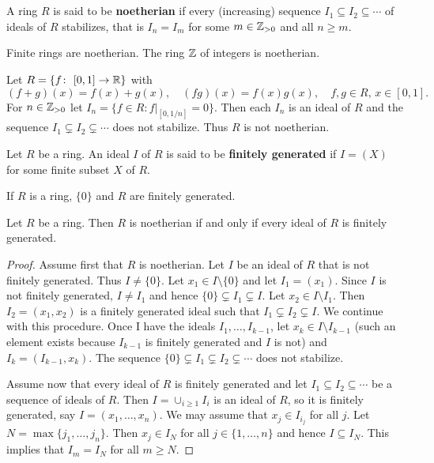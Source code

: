 \chapter{}


\begin{definition}
	A ring $R$ is said to be \textbf{noetherian} if every (increasing)
	sequence $I_1\subseteq I_2\subseteq\cdots$ of ideals of $R$
	stabilizes, that is $I_n=I_m$ for some $m\in\mathbb{Z}_{>0}$ and all $n\geq m$. 
\end{definition}

Finite rings
are noetherian. The ring $\mathbb{Z}$ of integers is noetherian.

\begin{exercise}
Let $R=\{f\colon [0,1]\to\R\}$ with 
\[
(f+g)(x)=f(x)+g(x),
\quad
(fg)(x)=f(x)g(x),
\quad
f,g\in R,\,x\in [0,1].
\]
For $n\in\mathbb{Z}_{>0}$ let
$I_n=\{f\in R:f|_{[0,1/n]}=0\}$. Then each $I_n$ is an ideal of $R$ and 
the sequence 
$I_1\subsetneq I_2\subsetneq\cdots$ 
does not stabilize. Thus $R$ is not noetherian. 
\end{exercise}

\begin{definition}
	Let $R$ be a ring. An ideal $I$ of $R$ 
	is said to be \textbf{finitely generated} if $I=(X)$ for some
	finite subset $X$ of $R$. 
\end{definition}

If $R$ is a ring, $\{0\}$ and $R$ are finitely generated. 

\begin{proposition}
Let $R$ be a ring. Then $R$ is noetherian if and only 
if every ideal of $R$ is finitely generated. 	
\end{proposition}

\begin{proof}
	Assume first that $R$ is noetherian. Let $I$ be an ideal of $R$ that is not finitely generated. 
	Thus $I\ne\{0\}$. Let $x_1\in I\setminus\{0\}$ and let $I_1=(x_1)$. Since $I$ is not finitely
	generated, $I\ne I_1$ and hence   
	$\{0\}\subsetneq I_1\subsetneq I$. Let $x_2\in I\setminus I_1$. Then
	$I_2=(x_1,x_2)$ is a finitely generated ideal such that 
	$I_1\subsetneq I_2\subsetneq I$. We continue with this 
	procedure. Once I have the ideals $I_1,\dots,I_{k-1}$, let 
	$x_k\in I\setminus I_{k-1}$ (such an element exists because $I_{k-1}$ is finitely generated
	and $I$ is not) and $I_k=(I_{k-1},x_k)$. The sequence
	$\{0\}\subsetneq I_1\subsetneq I_2\subsetneq\cdots$ does not stabilize.  
	
	Assume now that every ideal of $R$ is finitely generated and 
	let $I_1\subseteq I_2\subseteq\cdots$ be a sequence of ideals of $R$. Then
	$I=\cup_{i\geq1}I_i$ is an ideal of $R$, so it is finitely generated, say
	$I=(x_1,\dots,x_n)$. We may assume that $x_j\in I_{i_j}$ for all $j$. Let 
	$N=\max\{j_1,\dots,j_n\}$. Then 
	$x_j\in I_N$ for all $j\in\{1,\dots,n\}$ 
	and hence $I\subseteq I_N$. This implies that 
	$I_m=I_N$ for all $m\geq N$. 
\end{proof}


